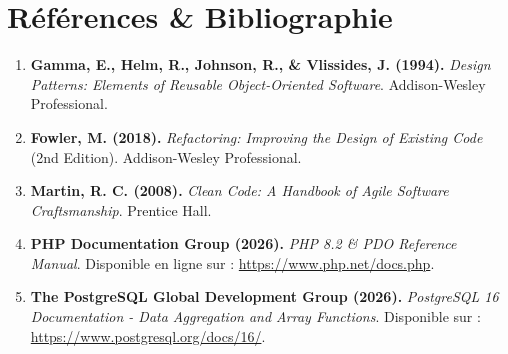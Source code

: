 \documentclass[11pt,a4paper,oneside]{report}
\begin{document}
\chapter{Références \& Bibliographie}
\label{anx:bibliographie}

\begin{enumerate}
    \item \textbf{Gamma, E., Helm, R., Johnson, R., \& Vlissides, J. (1994).} \textit{Design Patterns: Elements of Reusable Object-Oriented Software}. Addison-Wesley Professional.
    \item \textbf{Fowler, M. (2018).} \textit{Refactoring: Improving the Design of Existing Code} (2nd Edition). Addison-Wesley Professional.
    \item \textbf{Martin, R. C. (2008).} \textit{Clean Code: A Handbook of Agile Software Craftsmanship}. Prentice Hall.
    \item \textbf{PHP Documentation Group (2026).} \textit{PHP 8.2 & PDO Reference Manual}. Disponible en ligne sur : \url{https://www.php.net/docs.php}.
    \item \textbf{The PostgreSQL Global Development Group (2026).} \textit{PostgreSQL 16 Documentation - Data Aggregation and Array Functions}. Disponible sur : \url{https://www.postgresql.org/docs/16/}.
\end{enumerate}
\end{document}
